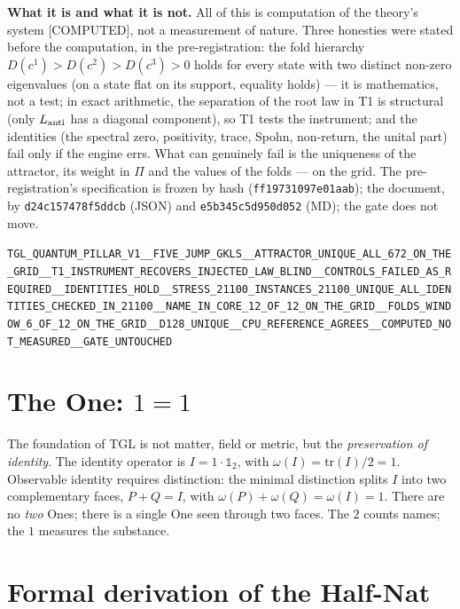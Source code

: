 \documentclass[11pt]{article}
\theoremstyle{definition}\newtheorem{deriv}{Derivation}
\begin{document}
\textbf{What it is and what it is not.} All of this is computation of the theory's system \textsf{[COMPUTED]}, not a measurement of nature. Three honesties were stated before the computation, in the pre-registration: the fold hierarchy $D(c^1)>D(c^2)>D(c^3)>0$ holds for every state with two distinct non-zero eigenvalues (on a state flat on its support, equality holds) --- it is mathematics, not a test; in exact arithmetic, the separation of the root law in T1 is structural (only $L_{\rm anti}$ has a diagonal component), so T1 tests the instrument; and the identities (the spectral zero, positivity, trace, Spohn, non-return, the unital part) fail only if the engine errs. What can genuinely fail is the uniqueness of the attractor, its weight in $\Pi$ and the values of the folds --- on the grid. The pre-registration's specification is frozen by hash (\texttt{ff19731097e01aab}); the document, by \texttt{d24c157478f5ddcb} (JSON) and \texttt{e5b345c5d950d052} (MD); the gate does not move.

\begin{center}\small\texttt{TGL\_QUANTUM\_PILLAR\_V1\_\_FIVE\_JUMP\_GKLS\_\_ATTRACTOR\_UNIQUE\_ALL\_672\_ON\_THE\_GRID\_\_T1\_INSTRUMENT\_RECOVERS\_INJECTED\_LAW\_BLIND\_\_CONTROLS\_FAILED\_AS\_REQUIRED\_\_IDENTITIES\_HOLD\_\_STRESS\_21100\_INSTANCES\_21100\_UNIQUE\_ALL\_IDENTITIES\_CHECKED\_IN\_21100\_\_NAME\_IN\_CORE\_12\_OF\_12\_ON\_THE\_GRID\_\_FOLDS\_WINDOW\_6\_OF\_12\_ON\_THE\_GRID\_\_D128\_UNIQUE\_\_CPU\_REFERENCE\_AGREES\_\_COMPUTED\_NOT\_MEASURED\_\_GATE\_UNTOUCHED}\end{center}

\section{The One: $1=1$}

The foundation of TGL is not matter, field or metric, but the \emph{preservation of identity}. The identity operator is $I=1\cdot\mathbb{1}_2$, with $\omega(I)=\mathrm{tr}(I)/2=1$. Observable identity requires distinction: the minimal distinction splits $I$ into two complementary faces, $P+Q=I$, with $\omega(P)+\omega(Q)=\omega(I)=1$. There are no \emph{two} Ones; there is a single One seen through two faces. The $2$ counts names; the $1$ measures the substance.

\section{Formal derivation of the Half-Nat}
\end{document}
